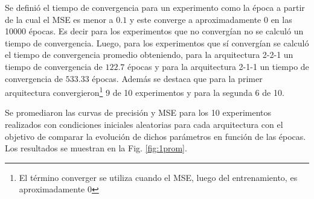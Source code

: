 \documentclass[11pt,twocolumn,twoside]{opticajnl}
\begin{document}
Se definió el tiempo de convergencia para un experimento como la época a partir de la cual el MSE es menor a $0.1$ y este converge a aproximadamente 0 en las 10000 épocas. Es decir para los experimentos que no convergían no se calculó un tiempo de convergencia. Luego, para los experimentos que sí convergían se calculó el tiempo de convergencia promedio obteniendo, para la arquitectura 2-2-1 un tiempo de convergencia de $122.7$ épocas y para la arquitectura 2-1-1 un tiempo de convergencia de $533.33$ épocas. Además se destaca que para la primer arquitectura convergieron\footnote{El término converger se utiliza cuando el MSE, luego del entrenamiento, es aproximadamente 0} 9 de 10 experimentos y para la segunda 6 de 10.

Se promediaron las curvas de precisión y MSE para los 10 experimentos realizados con condiciones iniciales aleatorias para cada arquitectura con el objetivo de comparar la evolución de dichos parámetros en función de las épocas. Los resultados se muestran en la Fig. \ref{fig:1prom}. 
\end{document}
